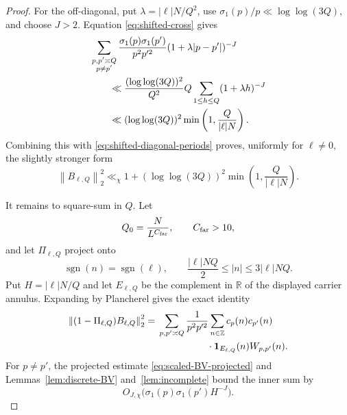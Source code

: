\documentclass[11pt]{article}
\numberwithin{equation}{section}
\theoremstyle{definition}
\newcommand{\R}{\mathbb R}
\newcommand{\Z}{\mathbb Z}
\newcommand{\1}{\mathbf 1}
\newcommand{\sgn}{\operatorname{sgn}}
\newcommand{\norm}[1]{\left\lVert#1\right\rVert}
\begin{document}
\begin{proof}
For the off-diagonal, put \(\lambda=|\ell|N/Q^2\), use
\(\sigma_1(p)/p\ll\log\log(3Q)\), and choose \(J>2\).  Equation
\eqref{eq:shifted-cross} gives
\begin{align}
 &\sum_{\substack{p,p'\asymp Q\\p\ne p'}}
 \frac{\sigma_1(p)\sigma_1(p')}{p^2p'^2}
 (1+\lambda|p-p'|)^{-J}\notag\\
 &\qquad\ll
 \frac{(\log\log(3Q))^2}{Q^2}
 Q\sum_{1\le h\le Q}(1+\lambda h)^{-J}\notag\\
 &\qquad\ll
 (\log\log(3Q))^2
 \min\left(1,\frac{Q}{|\ell|N}\right).
 \label{eq:shifted-offdiagonal-sum}
\end{align}
Combining this with \eqref{eq:shifted-diagonal-periods} proves, uniformly
for \(\ell\ne0\), the slightly stronger form
\begin{equation}\label{eq:shifted-Q}
 \norm{B_{\ell,Q}}_2^2
 \ll_\chi
 1+(\log\log(3Q))^2
 \min\left(1,\frac{Q}{|\ell|N}\right).
\end{equation}

It remains to square-sum in \(Q\).  Let
\[
 Q_0=\frac{N}{L^{C_{\rm far}}},\qquad C_{\rm far}>10,
\]
and let \(\Pi_{\ell,Q}\) project onto
\[
 \sgn(n)=\sgn(\ell),\qquad
 \frac{|\ell|NQ}{2}\le|n|\le3|\ell|NQ.
\]
Put \(H=|\ell|N/Q\) and let \(E_{\ell,Q}\) be the complement in
\(\R\) of the displayed carrier annulus.  Expanding by Plancherel gives
the exact identity
\begin{equation}\label{eq:carrier-expansion}
 \begin{split}
 \norm{(1-\Pi_{\ell,Q})B_{\ell,Q}}_2^2
 ={}&\sum_{p,p'\asymp Q}\frac1{p^2p'^2}
 \sum_{n\in\Z}c_p(n)c_{p'}(n)\\
 &\hspace{18mm}\cdot
 \1_{E_{\ell,Q}}(n)W_{p,p'}(n).
 \end{split}
\end{equation}
For \(p\ne p'\), the projected estimate
\eqref{eq:scaled-BV-projected} and Lemmas~\ref{lem:discrete-BV}
and~\ref{lem:incomplete} bound the inner sum by
\begin{equation}\label{eq:carrier-offdiagonal-inner}
 O_{J,\chi}\bigl(\sigma_1(p)\sigma_1(p')H^{-J}\bigr).
\end{equation}


\end{proof}
\end{document}
